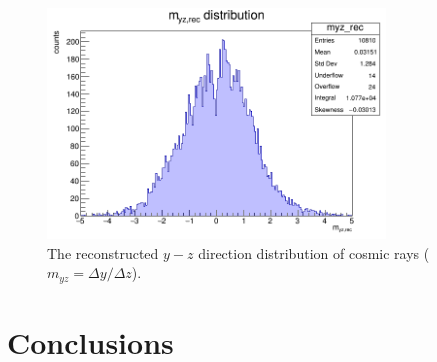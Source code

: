 \begin{figure}[!h]
    \centering
    \includegraphics[width=0.8\textwidth]{figures/png/myz_rec.png}
    \caption{The reconstructed $y-z$ direction distribution of cosmic rays ($m_{yz}=\Delta y /\Delta z$).}
    \label{fig:myzrec}
\end{figure}
\section{Conclusions}










